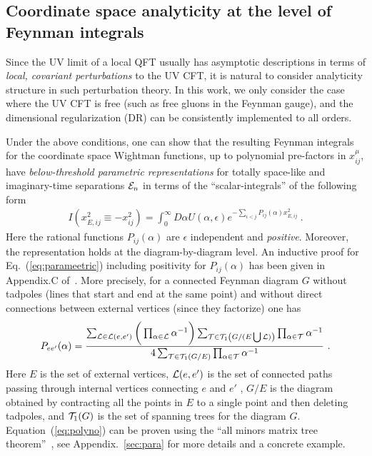 \documentclass[a4paper,11pt]{article}
\begin{document}
\subsection{Coordinate space analyticity at the level of Feynman integrals}
Since the UV limit of a local QFT usually has asymptotic descriptions in terms of {\it local, covariant perturbations} to the UV CFT, it is natural to consider analyticity structure in such perturbation theory. In this work, we only consider the case where the UV CFT is free (such as free gluons in the Feynman gauge), and the dimensional regularization (DR) can be consistently implemented to all orders. 

Under the above conditions, one can show that the resulting Feynman integrals for the coordinate space Wightman functions, up to  polynomial pre-factors in $x_{ij}^{\mu}$, have {\it below-threshold parametric representations} for totally space-like and imaginary-time separations ${\cal E}_n$ in terms of the ``scalar-integrals'' of the following form
\begin{align}\label{eq:parameetric}
I(x_{E,ij}^2\equiv -x_{ij}^2)=\int_{0}^{\infty} D\alpha U(\alpha,\epsilon)e^{-\sum_{i<j}P_{ij}(\alpha)x_{E,ij}^2} \ .
\end{align}
Here the rational functions $P_{ij}(\alpha)$ are $\epsilon$ independent and {\it positive}. Moreover, the representation holds at the diagram-by-diagram level. An inductive proof for Eq.~(\ref{eq:parameetric}) including positivity for $P_{ij}(\alpha)$ has been given in Appendix.C of~\cite{Ji:2023pba}. More precisely, for a connected Feynman diagram $G$ without tadpoles (lines that start and end at the same point) and without direct connections between external vertices (since they factorize) one has
\begin{align}\label{eq:polyno}
P_{ee'}(\alpha)=\frac{\sum_{{\cal L} \in {\cal L}(e,e')}\bigg(\prod_{\alpha \in {\cal L}}\alpha^{-1}\bigg)\sum_{{\cal T} \in {\cal T}_1\left(G/(E\bigcup {\cal L})\right)}\prod_{\alpha \in {\cal T}}\alpha^{-1} }{4\sum_{{\cal T} \in {\cal T}_1\left(G/E\right)}\prod_{\alpha \in {\cal T}}\alpha^{-1}} \ .
\end{align}
Here $E$ is the set of external vertices, ${\cal L}(e,e')$ is the set of connected paths passing through internal vertices connecting $e$ and $e'$ ,  $G/E$ is the diagram obtained by contracting all the points in $E$ to a single point and then deleting tadpoles, and ${\cal T}_1(G)$ is the set of spanning trees for the diagram $G$. Equation~(\ref{eq:polyno}) can be proven using the ``all minors matrix tree theorem''~\cite{Bogner:2010kv}, see Appendix.~\ref{sec:para} for more details and a concrete example. 
\end{document}

